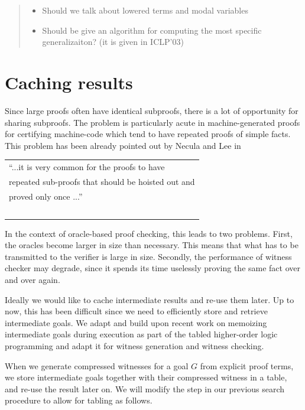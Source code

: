 \documentclass{acmconf}
\newenvironment{note}{\begin{quote}\message{note!}\it}{\end{quote}}
\begin{document}
\begin{note}
  \begin{itemize}
  \item Should we talk about lowered terms and modal variables
  \item Should be give an algorithm for computing the most specific
    generalizaiton? (it is given in ICLP'03)
  \end{itemize}
\end{note}


\section{Caching results}
\label{sec:tabling}
Since large proofs often have identical subproofs,  there is a
lot of opportunity for sharing subproofs. The problem is particularly
acute in machine-generated proofs for certifying machine-code which
tend to have repeated proofs of simple facts. This problem has been
already pointed out by Necula and Lee in \cite{NeculaLee+97:resource}

 \begin{tabular}[h]{l}
``...it is very common for the proofs to have  \\
repeated sub-proofs that should be hoisted out and \\
proved only once ...'' \cite{NeculaLee+97:resource}\\ $\;$
 \end{tabular}


In the context of oracle-based proof checking, this leads to two
problems.  First, the oracles become larger in size than
necessary. This means that what has to be transmitted to the verifier
is large in size. Secondly, the performance of witness checker may
degrade, since it spends its time uselessly proving the same fact over
and over again. 

Ideally we would like to cache intermediate results and re-use them
later. Up to now, this has been difficult since we need to efficiently
store and retrieve intermediate goals. We adapt and build upon recent
work \cite{Pientka03phd} on memoizing intermediate goals during
execution as part of the tabled higher-order logic programming and
adapt it for witness generation and witness checking. 

When we generate compressed witnesses for a goal $G$ from explicit
proof terms, we store intermediate goals together with their
compressed witness in a table, and re-use the result later on. 
We will modify the {} step in our previous search procedure
to allow for tabling as follows.
\end{document}
